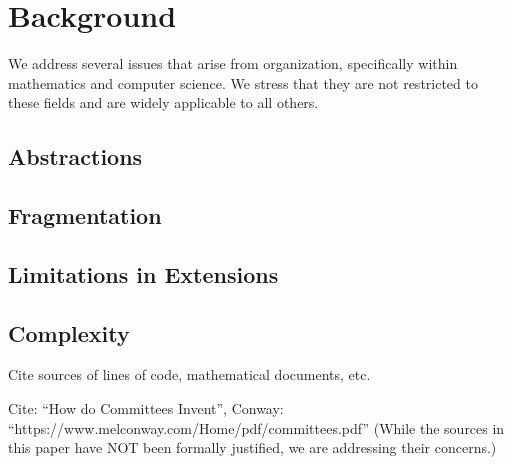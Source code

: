 \chapter{Background}
\label{ch:background}
We address several issues that arise from organization, specifically within mathematics and computer science. We stress that they are not restricted to these fields and are widely applicable to all others.

\section*{Abstractions}

\section*{Fragmentation}

\section*{Limitations in Extensions} %

\section*{Complexity} Cite sources of lines of code, mathematical documents, etc.

Cite: ``How do Committees Invent'', Conway: ``https://www.melconway.com/Home/pdf/committees.pdf'' (While the sources in this paper have NOT been formally justified, we are addressing their concerns.)





